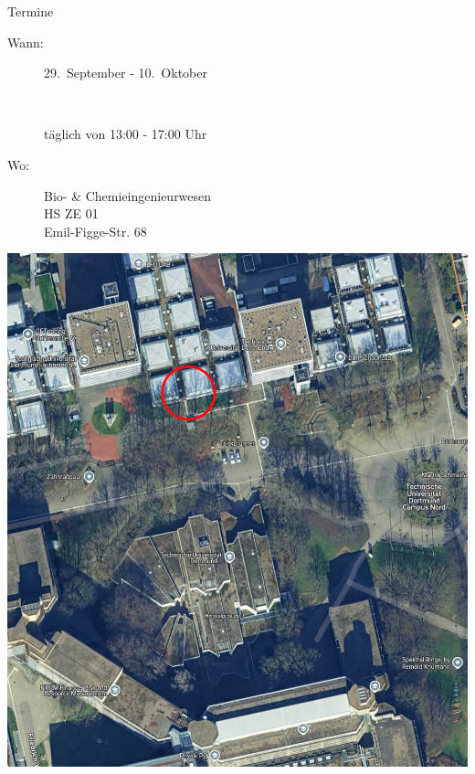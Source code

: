 \begin{frame}{Termine}
  \huge
  \begin{minipage}{0.6\textwidth}
    \begin{description}
      \item[Wann:] 29.~September - 10.~Oktober
      \item[~] täglich von 13:00 - 17:00 Uhr
      \vspace{1em}
      \item[Wo:] Bio- \& Chemieingenieurwesen\\
        HS ZE 01\\
        Emil-Figge-Str. 68
    \end{description}
  \end{minipage}
  \begin{minipage}{0.39\textwidth}
    \includegraphics[width=\textwidth]{Lageplan_EF68.jpg}
  \end{minipage}
\end{frame}

